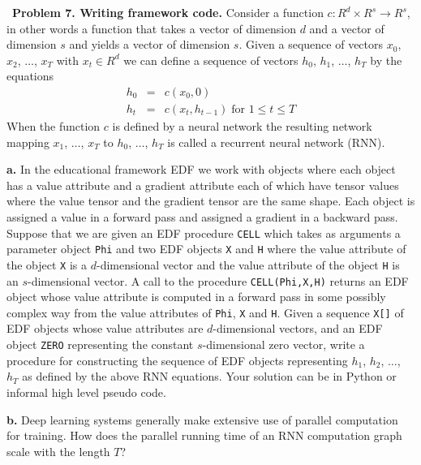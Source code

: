 \documentclass{article}
\newcommand{\solution}[1]{}
\begin{document}
\bigskip
~{\bf Problem 7. Writing framework code.} Consider a function $c:R^d \times R^s \rightarrow R^s$, in other words a function that takes a
vector of dimension $d$ and a vector of dimension $s$ and yields a vector of dimension
$s$.  Given a sequence of vectors $x_0$, $x_2$, $\ldots$, $x_T$ with $x_t \in R^d$ we can define a sequence of vectors $h_0$, $h_1$, $\ldots$, $h_T$ by the equations
\begin{eqnarray*}
  h_{0} & = & c(x_0,0) \\
  h_{t} & = & c(x_t,h_{t-1})\;\mbox{for $1 \leq t \leq T$} 
\end{eqnarray*}
When the function $c$ is defined by a neural network the resulting network mapping $x_1$, $\ldots$, $x_T$ to $h_0$, $\ldots$, $h_T$ is called a recurrent neural network (RNN).

{\bf a.} In the educational framework EDF we work with objects where each object has a value attribute and a gradient attribute each of which have tensor values
where the value tensor and the gradient tensor are the same shape. 
Each object is assigned a value in a forward pass and assigned a gradient in a backward pass.
Suppose that we are given an EDF procedure {\tt CELL} which takes as
arguments a parameter object {\tt Phi} and two EDF objects {\tt X} and {\tt H} where the value attribute of the object {\tt X} is a $d$-dimensional vector and the value attribute of the object {\tt H} is an $s$-dimensional vector.  A call to the procedure {\tt CELL(Phi,X,H)} returns an EDF object whose value attribute is computed in a forward pass in some possibly complex way
from the value attributes of {\tt Phi}, {\tt X} and {\tt H}. 
Given a sequence {\tt X[]} of EDF objects whose value attributes are $d$-dimensional vectors, and an EDF object {\tt ZERO} representing the constant $s$-dimensional zero vector,
write a procedure for constructing the sequence of EDF objects representing $h_1$, $h_2$, $\ldots$, $h_T$ as defined by the above RNN equations.
Your solution can be in Python or informal high level pseudo code.

\solution{
We can use the equations given as the definition of the computation graph if we replace $c$ in the equations with the function {\tt CELL}.
\begin{tabbing}
  X = list() \\
  H = list() \\
  H[0] = CELL(Phi,X[0],ZERO) \\
  for \=t in range(1,T) \\
  \>H[t] = CELL(Phi,X[t],H[t-1])
\end{tabbing}
}

{\bf b.} Deep learning systems generally make extensive use of parallel computation for training.
How does the parallel running time of an RNN computation graph scale with the length $T$?

\solution{
  The parallel running time is proportional to $T$. RNNS are fundamentally serial and this is a problem.  RNNs have recently been largely replaced by the transformer architecture.}
    
\end{document}
